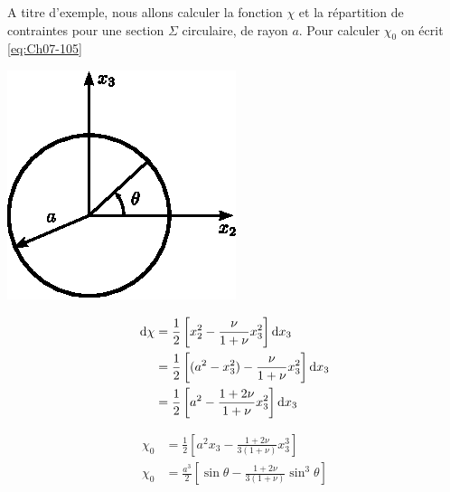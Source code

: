 A titre d'exemple, nous allons calculer la fonction $\chi$ et la répartition de contraintes pour une section $\Sigma$ circulaire, de rayon $a$.
Pour calculer $\chi_0$ on écrit \eqref{eq:Ch07-105}
\begin{multicols}{2}
    \begin{center}
        \includegraphics{../images/T1_Ch07-21}
    \end{center}
    \columnbreak
    \begin{align*}
        \mathop{\mathrm{{}d}}\mathopen{}\chi &= \frac{1}{2} \left[ x_2^2 - \frac{\nu}{1+\nu} x_3^2 \right] \mathop{\mathrm{{}d}}\mathopen{} x_3 \\
        &= \frac{1}{2} \left[ (a^2 - x_3^2) - \frac{\nu}{1+\nu} x_3^2 \right] \mathop{\mathrm{{}d}}\mathopen{} x_3 \\
        &= \frac{1}{2} \left[ a^2 - \frac{1+2\nu}{1+\nu} x_3^2 \right] \mathop{\mathrm{{}d}}\mathopen{} x_3
    \end{align*}
\end{multicols}
\begin{align}
    \chi_0 &= \frac{1}{2} \left[ a^2 x_3 - \frac{1+2\nu}{3(1+\nu)} x_3^3 \right] \nonumber\\
    \chi_0 &= \frac{a^3}{2} \left[ \sin \theta - \frac{1+2\nu}{3(1+\nu)} \sin^3 \theta \right]
    \label{eq:Ch07-120}
\end{align}

